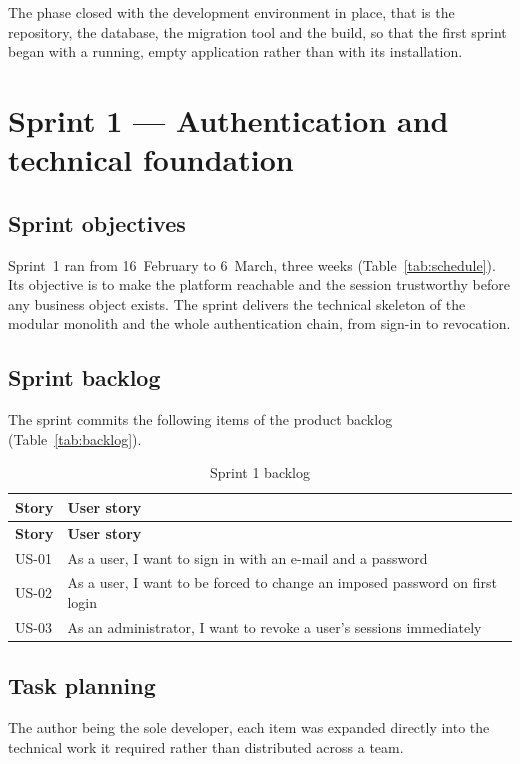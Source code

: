 The phase closed with the development environment in place, that is the repository, the database,
the migration tool and the build, so that the first sprint began with a running, empty application
rather than with its installation.

\section{Sprint 1 --- Authentication and technical foundation}

\subsection{Sprint objectives}
Sprint~1 ran from 16~February to 6~March, three weeks (Table~\ref{tab:schedule}). Its objective is
to make the platform reachable and the session trustworthy before any business object exists. The
sprint delivers the technical skeleton of the modular monolith and the whole authentication chain,
from sign-in to revocation.

\subsection{Sprint backlog}
The sprint commits the following items of the product backlog (Table~\ref{tab:backlog}).

\begin{longtable}{|m{1.6cm}|m{12.4cm}|}
\caption{Sprint 1 backlog}\label{tab:sb1}\\
\hline
\textbf{Story} & \textbf{User story} \\
\hline
\endfirsthead
\hline
\textbf{Story} & \textbf{User story} \\
\hline
\endhead
\endfoot
\endlastfoot
\hline
US-01 & As a user, I want to sign in with an e-mail and a password \\
\hline
US-02 & As a user, I want to be forced to change an imposed password on first login \\
\hline
US-03 & As an administrator, I want to revoke a user's sessions immediately \\
\hline
\end{longtable}

\subsection{Task planning}
The author being the sole developer, each item was expanded directly into the technical work it
required rather than distributed across a team.

